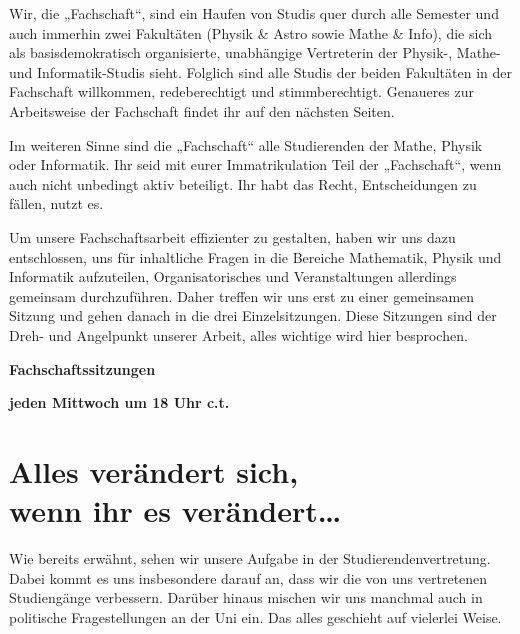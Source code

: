 Wir, die „Fachschaft“, sind ein Haufen von Studis quer durch alle Semester und auch immerhin zwei Fakultäten (Physik \& Astro sowie Mathe \& Info), die sich als basisdemokratisch organisierte, unabhängige Vertreterin der Physik-, Mathe- und Informatik-Studis sieht. Folglich sind alle Studis der beiden Fakultäten in der Fachschaft willkommen, redeberechtigt und stimmberechtigt. Genaueres zur Arbeitsweise der Fachschaft findet ihr auf den nächsten Seiten.

Im weiteren Sinne sind die „Fachschaft“ alle Studierenden der Mathe, Physik oder Informatik. Ihr seid mit eurer Immatrikulation Teil der „Fachschaft“, wenn auch nicht unbedingt aktiv beteiligt. Ihr habt das Recht, Entscheidungen zu fällen, nutzt es.

Um unsere Fachschaftsarbeit effizienter zu gestalten, haben wir uns dazu entschlossen, uns für inhaltliche Fragen in die Bereiche Mathematik, Physik und Informatik aufzuteilen, Organisatorisches und Veranstaltungen allerdings gemeinsam durchzuführen. Daher treffen wir uns erst zu einer gemeinsamen Sitzung und gehen danach in die drei Einzelsitzungen. Diese Sitzungen sind der Dreh- und Angelpunkt unserer Arbeit, alles wichtige wird hier besprochen.

\begin{center}
\large
\textbf{Fachschaftssitzungen}

\textbf{jeden Mittwoch um 18 Uhr \gls{c.t.}}
\end{center}

\begin{figure}[b]

\end{figure}

\section[Alles verändert sich, wenn ihr es verändert\dots]{Alles verändert sich, \\wenn ihr es verändert\dots}
Wie bereits erwähnt, sehen wir unsere Aufgabe in der Studierendenvertretung. Dabei kommt es uns insbesondere darauf an, dass wir die von uns vertretenen Studiengänge verbessern. Darüber hinaus mischen wir uns manchmal auch in politische Fragestellungen an der Uni ein. Das alles geschieht auf vielerlei Weise.

